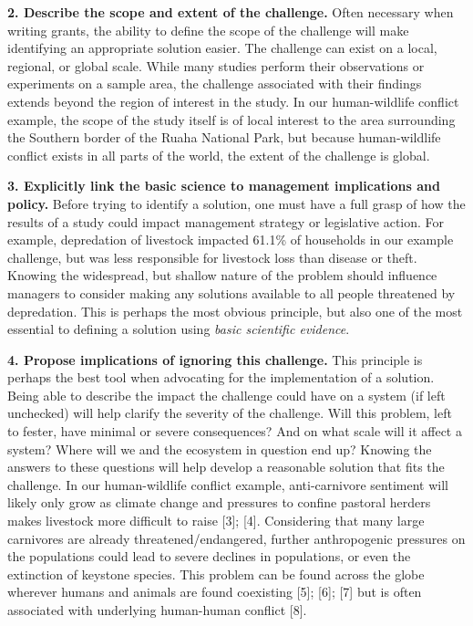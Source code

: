 \documentclass[10pt,letterpaper]{article}
\begin{document}
\textbf{2. Describe the scope and extent of the challenge.} Often
necessary when writing grants, the ability to define the scope of the
challenge will make identifying an appropriate solution easier. The
challenge can exist on a local, regional, or global scale. While many
studies perform their observations or experiments on a sample area, the
challenge associated with their findings extends beyond the region of
interest in the study. In our human-wildlife conflict example, the scope
of the study itself is of local interest to the area surrounding the
Southern border of the Ruaha National Park, but because human-wildlife
conflict exists in all parts of the world, the extent of the challenge
is global.

\textbf{3. Explicitly link the basic science to management implications
and policy.} Before trying to identify a solution, one must have a full
grasp of how the results of a study could impact management strategy or
legislative action. For example, depredation of livestock impacted
61.1\% of households in our example challenge, but was less responsible
for livestock loss than disease or theft. Knowing the widespread, but
shallow nature of the problem should influence managers to consider
making any solutions available to all people threatened by depredation.
This is perhaps the most obvious principle, but also one of the most
essential to defining a solution using \emph{basic scientific evidence}.

\textbf{4. Propose implications of ignoring this challenge.} This
principle is perhaps the best tool when advocating for the
implementation of a solution. Being able to describe the impact the
challenge could have on a system (if left unchecked) will help clarify
the severity of the challenge. Will this problem, left to fester, have
minimal or severe consequences? And on what scale will it affect a
system? Where will we and the ecosystem in question end up? Knowing the
answers to these questions will help develop a reasonable solution that
fits the challenge. In our human-wildlife conflict example,
anti-carnivore sentiment will likely only grow as climate change and
pressures to confine pastoral herders makes livestock more difficult to
raise {[}3{]}; {[}4{]}. Considering that many large carnivores are
already threatened/endangered, further anthropogenic pressures on the
populations could lead to severe declines in populations, or even the
extinction of keystone species. This problem can be found across the
globe wherever humans and animals are found coexisting {[}5{]}; {[}6{]};
{[}7{]} but is often associated with underlying human-human conflict
{[}8{]}.
\end{document}
